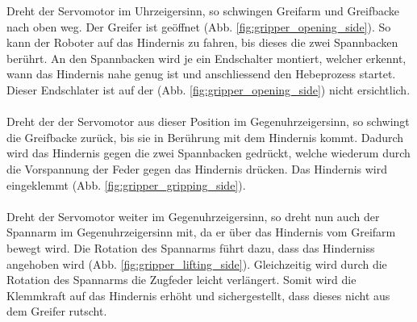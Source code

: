 Dreht der Servomotor im Uhrzeigersinn, so schwingen Greifarm und Greifbacke nach oben weg. Der Greifer ist geöffnet (Abb. \ref{fig:gripper_opening_side}). So kann der Roboter auf das Hindernis zu fahren, bis dieses die zwei Spannbacken berührt. An den Spannbacken wird je ein Endschalter montiert, welcher erkennt, wann das Hindernis nahe genug ist und anschliessend den Hebeprozess startet. Dieser Endschlater ist auf der (Abb. \ref{fig:gripper_opening_side}) nicht ersichtlich. \\
\\
Dreht der der Servomotor aus dieser Position im Gegenuhrzeigersinn, so schwingt die Greifbacke zurück, bis sie in Berührung mit dem Hindernis kommt. Dadurch wird das Hindernis gegen die zwei Spannbacken gedrückt, welche wiederum durch die Vorspannung der Feder gegen das Hindernis drücken. Das Hindernis wird eingeklemmt (Abb. \ref{fig:gripper_gripping_side}).\\
\\
Dreht der Servomotor weiter im Gegenuhrzeigersinn, so dreht nun auch der Spannarm im Gegenuhrzeigersinn mit, da er über das Hindernis vom Greifarm bewegt wird. Die Rotation des Spannarms führt dazu, dass das Hinderniss angehoben wird (Abb. \ref{fig:gripper_lifting_side}). Gleichzeitig wird durch die Rotation des Spannarms die Zugfeder leicht verlängert. Somit wird die Klemmkraft auf das Hindernis erhöht und sichergestellt, dass dieses nicht aus dem Greifer rutscht.

